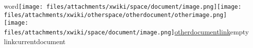 \documentclass{article}
\begin{document}
word\texttt{[image: files/attachments/xwiki/space/document/image.png]}\texttt{[image: files/attachments/xwiki/otherspace/otherdocument/otherimage.png]}\texttt{[image: files/attachments/xwiki/space/document/image.png]}\href{http://test/bin/view/OtherSpace/OtherDocument}{otherdocumentlink}emptylinkcurrentdocument
\end{document}
